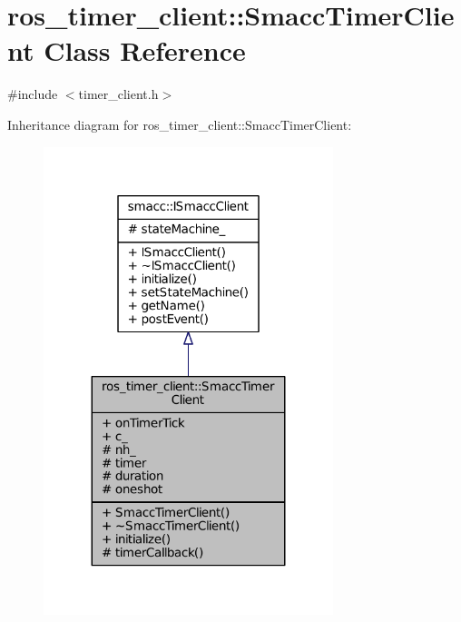 \hypertarget{classros__timer__client_1_1SmaccTimerClient}{}\section{ros\+\_\+timer\+\_\+client\+:\+:Smacc\+Timer\+Client Class Reference}
\label{classros__timer__client_1_1SmaccTimerClient}


{\ttfamily \#include $<$timer\+\_\+client.\+h$>$}



Inheritance diagram for ros\+\_\+timer\+\_\+client\+:\+:Smacc\+Timer\+Client\+:
\nopagebreak
\begin{figure}[H]
\begin{center}
\leavevmode
\includegraphics[width=239pt]{classros__timer__client_1_1SmaccTimerClient__inherit__graph}
\end{center}
\end{figure}


